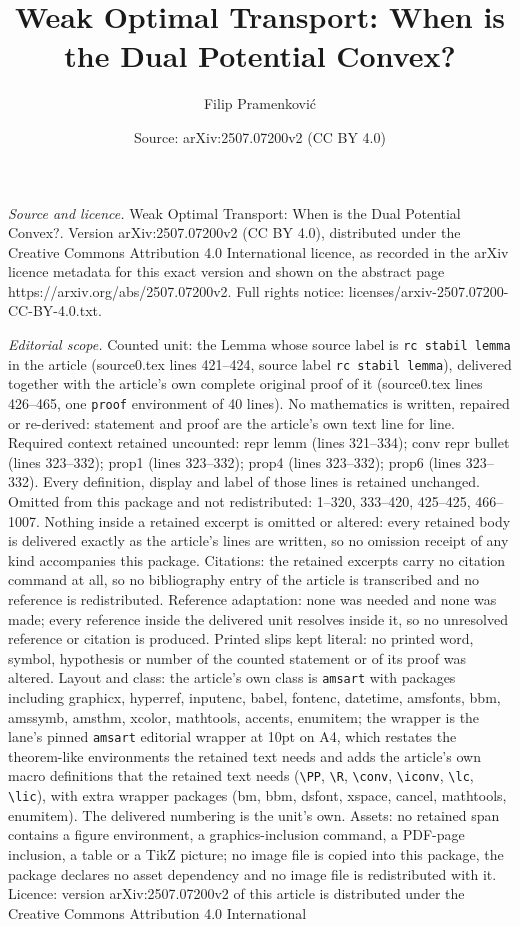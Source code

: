 \documentclass[10pt,a4paper]{amsart}
\title[Weak Optimal Transport: When is the Dual Potential Convex?]{Weak Optimal Transport: When is the Dual Potential Convex?}
\author{Filip Pramenkovi\'c}
\date{Source: arXiv:2507.07200v2 (CC BY 4.0)}
\begin{document}
\maketitle

\noindent\emph{Source and licence.} Weak Optimal Transport: When is the Dual Potential Convex?. Version arXiv:2507.07200v2 (CC BY 4.0), distributed under the Creative Commons Attribution 4.0 International licence, as recorded in the arXiv licence metadata for this exact version and shown on the abstract page https://arxiv.org/abs/2507.07200v2. Full rights notice: licenses/arxiv-2507.07200-CC-BY-4.0.txt.\par\smallskip

\noindent\textit{Editorial scope.} Counted unit: the Lemma whose source label is \texttt{rc stabil lemma} in the article (source0.tex lines 421--424, source label \texttt{rc stabil lemma}), delivered together with the article's own complete original proof of it (source0.tex lines 426--465, one \texttt{proof} environment of 40 lines). No mathematics is written, repaired or re-derived: statement and proof are the article's own text line for line. Required context retained uncounted: repr lemm (lines 321--334); conv repr bullet (lines 323--332); prop1 (lines 323--332); prop4 (lines 323--332); prop6 (lines 323--332). Every definition, display and label of those lines is retained unchanged. Omitted from this package and not redistributed: 1--320, 333--420, 425--425, 466--1007. Nothing inside a retained excerpt is omitted or altered: every retained body is delivered exactly as the article's lines are written, so no omission receipt of any kind accompanies this package. Citations: the retained excerpts carry no citation command at all, so no bibliography entry of the article is transcribed and no reference is redistributed. Reference adaptation: none was needed and none was made; every reference inside the delivered unit resolves inside it, so no unresolved reference or citation is produced. Printed slips kept literal: no printed word, symbol, hypothesis or number of the counted statement or of its proof was altered. Layout and class: the article's own class is \texttt{amsart} with packages including graphicx, hyperref, inputenc, babel, fontenc, datetime, amsfonts, bbm, amssymb, amsthm, xcolor, mathtools, accents, enumitem; the wrapper is the lane's pinned \texttt{amsart} editorial wrapper at 10pt on A4, which restates the theorem-like environments the retained text needs and adds the article's own macro definitions that the retained text needs (\texttt{\textbackslash PP}, \texttt{\textbackslash R}, \texttt{\textbackslash conv}, \texttt{\textbackslash iconv}, \texttt{\textbackslash lc}, \texttt{\textbackslash lic}), with extra wrapper packages (bm, bbm, dsfont, xspace, cancel, mathtools, enumitem). The delivered numbering is the unit's own. Assets: no retained span contains a figure environment, a graphics-inclusion command, a PDF-page inclusion, a table or a TikZ picture; no image file is copied into this package, the package declares no asset dependency and no image file is redistributed with it. Licence: version arXiv:2507.07200v2 of this article is distributed under the Creative Commons Attribution 4.0 International 
\end{document}
